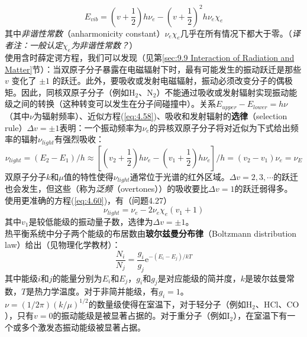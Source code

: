     \begin{equation}
        E_{vib} = \left(v+\frac{1}{2}\right)h\nu_e - \left(v+\frac{1}{2}\right)^2h\nu_e \chi_e
        \label{eq:4.60}
    \end{equation}
    其中\textit{非谐性常数}（anharmonicity constant）$\nu_e\chi_e$几乎在所有情况下都大于零。（\textit{译者注：一般认定$\chi_e$为非谐性常数？}）\\
    \indent 使用含时薛定谔方程，我们可以发现（见第\ref{sec:9.9 Interaction of Radiation and Matter}节）：当双原子分子暴露在电磁辐射下时，最有可能发生的振动跃迁是那些 $v$ 变化了 $\pm 1$ 的跃迁。此外，要吸收或发射电磁辐射，振动必须改变分子的偶极矩。因此，同核双原子分子（例如$\mathrm{H}_2$、$\mathrm{N}_2$）不能通过吸收或发射辐射实现振动能级之间的转换（这种转变可以发生在分子间碰撞中）。关系$E_{upper}-E_{lower} = h\nu$（其中$\nu$为辐射频率）、近似方程(\ref{eq:4.58})、吸收和发射辐射的\textbf{选律}（selection rule）$\Delta v = \pm 1$表明：一个振动频率为$\nu_e$的异核双原子分子将对近似为下式给出频率的辐射$\nu_{light}$有强烈吸收：
    \begin{equation}
        \nu_{light} = \left(E_2-E_1\right)/h \approx \left[\left(v_2+\frac{1}{2}\right)h\nu_e-\left(v_1+\frac{1}{2}\right)h\nu_e\right]/h = \left(v_2-v_1\right)\nu_e = \nu_E
        \label{eq:4.61}
    \end{equation}
    双原子分子$k$和$\mu$值的特性使得$\nu_{light}$通常位于光谱的红外区域。$\Delta v = 2,3,\cdots$的跃迁也会发生，但这些（称为\textit{泛频}（overtones））的吸收要比$\Delta v = 1$的跃迁弱得多。\\
    \indent 使用更准确的方程(\ref{eq:4.60})，有（问题4.27）
    \begin{equation}
        \nu_{light} = \nu_e - 2\nu_e\chi_e\left(v_1+1\right)
        \label{eq:4.62}
    \end{equation}
    其中$v_1$是较低能级的振动量子数，选律为$\Delta v = \pm 1$。\\
    \indent 热平衡系统中分子两个能级的布居数由\textbf{玻尔兹曼分布律}（Boltzmann distribution law）给出（见物理化学教材）：
    \begin{equation}
        \boxed{
            \frac{N_i}{N_j} = \frac{g_i}{g_j} \mathrm{e}^{-(E_i-E_j)/kT}
        }
        \label{eq:4.63}
    \end{equation}
    其中能级$i$和$j$的能量分别为$E_i$和$E_j$，$g_i$和$g_j$是对应能级的简并度，$k$是玻尔兹曼常数，$T$是热力学温度。对于非简并能级，有$g_i=1$。\\
    \indent $\nu = \left(1/2\pi\right)\left(k/\mu\right)^{1/2}$的数量级使得在室温下，对于轻分子（例如$\mathrm{H}_2$、$\mathrm{HCl}$、$\mathrm{CO}$），只有$v=0$的振动能级是被显著占据的。对于重分子（例如$\mathrm{I}_2$），在室温下有一个或多个激发态振动能级被显著占据。\\
